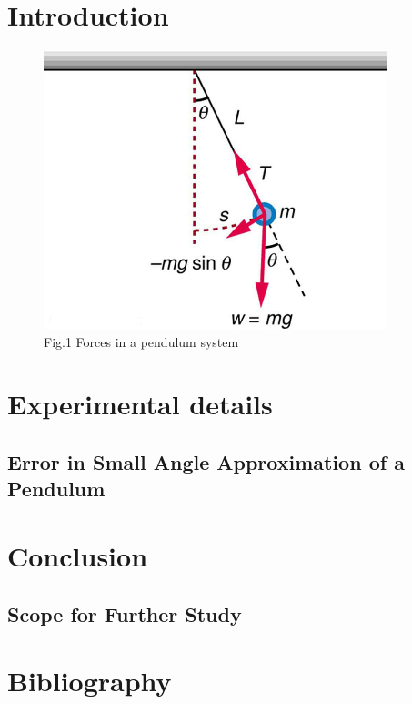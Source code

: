 \documentclass[12pt, twoside]{report}
\numberwithin{equation}{section}
\newcommand*\cleartoleftpage{%
  \clearpage
  \ifodd\value{page}\hbox{}\newpage\fi
}
\begin{document}
\chapter{Introduction}

\cleartoleftpage
\vspace*{6cm}
\begin{figure}[h]
  \begin{center}
    \includegraphics[width=10cm]{fig-1}
    \end{center}
  \caption*{Fig.1 Forces in a pendulum system}
 \end{figure}
\cleardoublepage
\chapter{Experimental details}
\section{Error in Small Angle Approximation of a Pendulum}

\cleardoublepage
\chapter{Conclusion}

\section{Scope for Further Study}

\cleardoublepage
\chapter{Bibliography}

\end{document}
